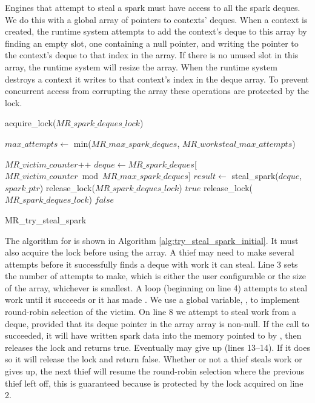 Engines that attempt to steal a spark must have access to all the spark
deques.
We do this with a global array of pointers to contexts' deques.
When a context is created,
the runtime system attempts to add the context's deque to this array by
finding an empty slot,
one containing a null pointer,
and writing the pointer to the context's deque to that index in the array.
If there is no unused slot in this array, the runtime system will resize the
array.
When the runtime system destroys a context it writes \NULL to that context's
index in the deque array.
To prevent concurrent access from corrupting the array these operations are
protected by the  lock.

\begin{algorithm}
\begin{algorithmic}[1]
  \State acquire\_lock($MR\_spark\_deques\_lock$)

  \State $max\_attempts \gets$ min($MR\_max\_spark\_deques$,
    $MR\_worksteal\_max\_attempts$)

    \State $MR\_victim\_counter$++
    \State $deque \gets
       MR\_spark\_deques$[$MR\_victim\_counter \bmod MR\_max\_spark\_deques$]
      \State $result \gets$ steal\_spark($deque$, $spark\_ptr$)
        \State release\_lock($MR\_spark\_deques\_lock$)
        \State \Return $true$
      \EndIf
    \EndIf
  \EndFor
  \State release\_lock($MR\_spark\_deques\_lock$)
  \State \Return $false$
\EndProcedure
\end{algorithmic}
\caption{MR\_try\_steal\_spark}
\label{alg:try_steal_spark_initial}
\end{algorithm}

The algorithm for \trystealspark is shown in
Algorithm \ref{alg:try_steal_spark_initial}.
It must also acquire the lock before using the array.
A thief may need to make several attempts before it successfully finds a
deque with work it can steal.
Line 3 sets the number of attempts to make, which is either the user
configurable  or the size of the array,
whichever is smallest.
A loop (beginning on line 4) attempts to steal work until it succeeds or it
has made .
We use a global variable, ,
to implement round-robin selection of the victim.
On line 8 we attempt to steal work from a deque,
provided that its deque pointer in the array array is non-null.
If the call to \steal succeeded,
it will have written spark data into the memory pointed to by
,
then \trystealspark releases the lock and returns true.
Eventually \trystealspark may give up (lines 13--14).
If it does so it will release the lock and return false.
Whether or not a thief steals work or gives up,
the next thief will resume the round-robin selection where the previous
thief left off,
this is guaranteed because  is protected by the
lock acquired on line 2.

